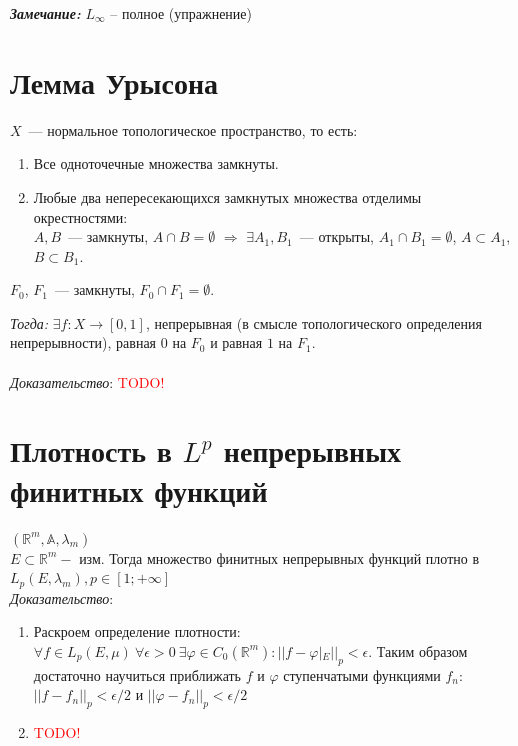 \documentclass[paper=a4, fontsize=17pt]{article}
\begin{document}
\textbf{\emph{Замечание:}} $ L_{\infty} $ -- полное (упражнение)

\section{Лемма Урысона}
$X$~--- нормальное топологическое пространство, то есть:
\begin{enumerate}
    \item Все одноточечные множества замкнуты.
    \item Любые два непересекающихся замкнутых множества отделимы окрестностями:\\
    $A,B$~--- замкнуты, $A \cap B = \emptyset$ $\Rightarrow$ $\exists A_1,B_1$~--- открыты, $A_1 \cap B_1 = \emptyset$,
    $A \subset A_1$, $B \subset B_1$.
\end{enumerate}

$F_0$, $F_1$~--- замкнуты, $F_0 \cap F_1 = \emptyset$.

\emph{Тогда:} $\exists f: X \rightarrow [0,1]$, непрерывная (в смысле топологического определения непрерывности), равная $0$ на $F_0$ и равная $1$ на $F_1$.
\\\\
\emph{Доказательство}:
\textcolor{red}{TODO!}

\section{Плотность в $L^p$ непрерывных финитных функций}
$(\mathbb{R}^m, \mathbb{A}, \lambda_m)$\\

$E \subset \mathbb{R}^m -$ изм. Тогда множество финитных непрерывных функций плотно в $L_p(E, \lambda_m), p \in [1; +\infty]$\\

\emph{Доказательство}:

\begin{enumerate}
	\item  Раскроем определение плотности: $\forall f \in L_p(E, \mu) \ \forall \epsilon > 0 \ \exists \varphi \in C_0(\mathbb{R}^m): ||f - \varphi|_E ||_p < \epsilon$. Таким образом достаточно научиться приближать $f$ и  $\varphi$ ступенчатыми функциями $f_n$: $||f-f_n||_p < \epsilon /2 $ и $||\varphi-f_n||_p < \epsilon /2 $

	\item	 \textcolor{red}{TODO!}

\end{enumerate}
\end{document}

